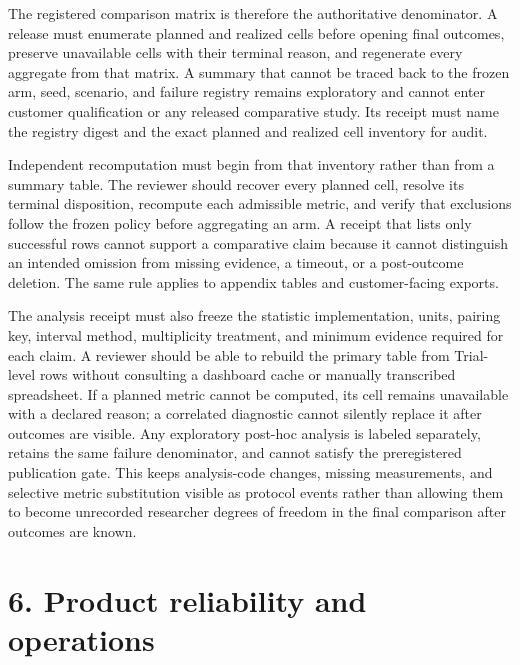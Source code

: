 The registered comparison matrix is therefore the authoritative
denominator. A release must enumerate planned and realized cells before
opening final outcomes, preserve unavailable cells with their terminal
reason, and regenerate every aggregate from that matrix. A summary that
cannot be traced back to the frozen arm, seed, scenario, and failure
registry remains exploratory and cannot enter customer qualification or
any released comparative study. Its receipt must name the registry
digest and the exact planned and realized cell inventory for audit.

Independent recomputation must begin from that inventory rather than from
a summary table. The reviewer should recover every planned cell, resolve
its terminal disposition, recompute each admissible metric, and verify
that exclusions follow the frozen policy before aggregating an arm. A
receipt that lists only successful rows cannot support a comparative
claim because it cannot distinguish an intended omission from missing
evidence, a timeout, or a post-outcome deletion. The same rule applies to
appendix tables and customer-facing exports.

The analysis receipt must also freeze the statistic implementation, units,
pairing key, interval method, multiplicity treatment, and minimum evidence
required for each claim. A reviewer should be able to rebuild the primary
table from Trial-level rows without consulting a dashboard cache or manually
transcribed spreadsheet. If a planned metric cannot be computed, its cell
remains unavailable with a declared reason; a correlated diagnostic cannot
silently replace it after outcomes are visible. Any exploratory post-hoc
analysis is labeled separately, retains the same failure denominator, and
cannot satisfy the preregistered publication gate. This keeps analysis-code
changes, missing measurements, and selective metric substitution visible as
protocol events rather than allowing them to become unrecorded researcher
degrees of freedom in the final comparison after outcomes are known.

\section{\texorpdfstring{\textbf{6. Product reliability and
operations}}{6. Product reliability and operations}}\label{product-reliability-and-operations}


